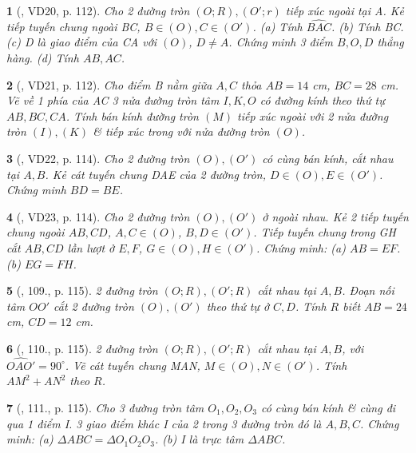 \documentclass{article}
\newtheorem{baitoan}{}
\begin{document}
\begin{baitoan}[\cite{Binh_Toan_9_tap_1}, VD20, p. 112]
	Cho 2 đường tròn $(O;R),(O';r)$ tiếp xúc ngoài tại A. Kẻ tiếp tuyến chung ngoài BC, $B\in(O),C\in(O')$. (a) Tính $\widehat{BAC}$. (b) Tính BC. (c) D là giao điểm của CA với $(O)$, $D\ne A$. Chứng minh 3 điểm $B,O,D$ thẳng hàng. (d) Tính $AB,AC$.
\end{baitoan}

\begin{baitoan}[\cite{Binh_Toan_9_tap_1}, VD21, p. 112]
	Cho điểm B nằm giữa $A,C$ thỏa $AB = 14$ {\rm cm}, $BC = 28$ {\rm cm}. Vẽ về 1 phía của AC 3 nửa đường tròn tâm $I,K,O$ có đường kính theo thứ tự $AB,BC,CA$. Tính bán kính đường tròn $(M)$ tiếp xúc ngoài với 2 nửa đường tròn $(I),(K)$ \& tiếp xúc trong với nửa đường tròn $(O)$.
\end{baitoan}

\begin{baitoan}[\cite{Binh_Toan_9_tap_1}, VD22, p. 114]
	Cho 2 đường tròn $(O),(O')$ có cùng bán kính, cắt nhau tại $A,B$. Kẻ cát tuyến chung DAE của 2 đường tròn, $D\in(O),E\in(O')$. Chứng minh $BD = BE$.
\end{baitoan}

\begin{baitoan}[\cite{Binh_Toan_9_tap_1}, VD23, p. 114]
	Cho 2 đường tròn $(O),(O')$ ở ngoài nhau. Kẻ 2 tiếp tuyến chung ngoài $AB,CD$, $A,C\in(O)$, $B,D\in(O')$. Tiếp tuyến chung trong GH cắt $AB,CD$ lần lượt ở $E,F$, $G\in(O),H\in(O')$. Chứng minh: (a) $AB = EF$. (b) $EG = FH$.
\end{baitoan}

\begin{baitoan}[\cite{Binh_Toan_9_tap_1}, 109., p. 115]
	2 đường tròn $(O;R),(O';R)$ cắt nhau tại $A,B$. Đoạn nối tâm $OO'$ cắt 2 đường tròn $(O),(O')$ theo thứ tự ở $C,D$. Tính $R$ biết $AB = 24$ {\rm cm}, $CD = 12$ {\rm cm}.
\end{baitoan}

\begin{baitoan}[\cite{Binh_Toan_9_tap_1}, 110., p. 115]
	2 đường tròn $(O;R),(O';R)$ cắt nhau tại $A,B$, với $\widehat{OAO'} = 90^\circ$. Vẽ cát tuyến chung MAN, $M\in(O),N\in(O')$. Tính $AM^2 + AN^2$ theo $R$.
\end{baitoan}

\begin{baitoan}[\cite{Binh_Toan_9_tap_1}, 111., p. 115]
	Cho 3 đường tròn tâm $O_1,O_2,O_3$ có cùng bán kính \& cùng đi qua 1 điểm I. 3 giao điểm khác I của 2 trong 3 đường tròn đó là $A,B,C$. Chứng minh: (a) $\Delta ABC = \Delta O_1O_2O_3$. (b) I là trực tâm $\Delta ABC$.
\end{baitoan}
\end{document}
